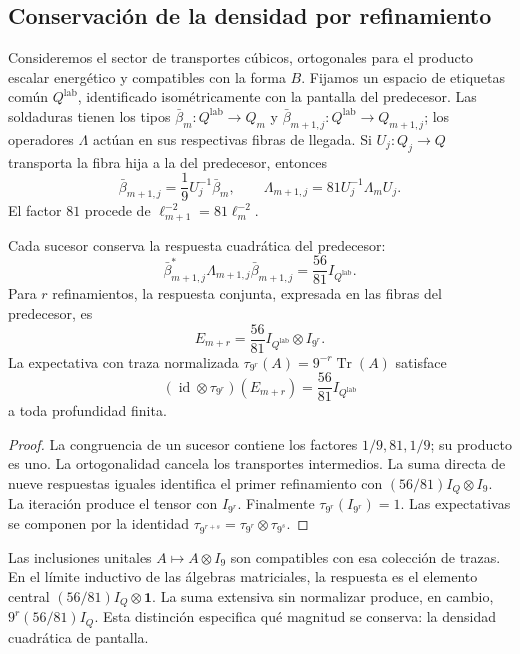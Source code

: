 \subsection{Conservación de la densidad por refinamiento}
\label{vii:sec:densidad-refinamiento}

Consideremos el sector de transportes cúbicos, ortogonales para el producto
escalar energético y compatibles con la forma \(B\). Fijamos un
espacio de etiquetas común \(Q^{\mathrm{lab}}\), identificado
isométricamente con la pantalla del predecesor. Las soldaduras tienen
los tipos
\(\bar\beta_m:Q^{\mathrm{lab}}\longrightarrow Q_m\) y
\(\bar\beta_{m+1,j}:Q^{\mathrm{lab}}\longrightarrow Q_{m+1,j}\);
los operadores \(\Lambda\) actúan en sus respectivas fibras de llegada.
Si
\(U_j:Q_j\longrightarrow Q\) transporta la fibra hija a la del predecesor,
entonces
\[
 \bar\beta_{m+1,j}=\frac19U_j^{-1}\bar\beta_m,\qquad
 \Lambda_{m+1,j}=81U_j^{-1}\Lambda_mU_j.
\]
El factor \(81\) procede de \(\ell_{m+1}^{-2}=81\ell_m^{-2}\).

\begin{theorem}
\label{vii:thm:densidad}
Cada sucesor conserva la respuesta cuadrática del predecesor:
\[
 \bar\beta_{m+1,j}^*\Lambda_{m+1,j}\bar\beta_{m+1,j}
 =\frac{56}{81}I_{Q^{\mathrm{lab}}}.
\]
Para \(r\) refinamientos, la respuesta conjunta, expresada en las fibras
del predecesor, es
\[
 E_{m+r}=\frac{56}{81}I_{Q^{\mathrm{lab}}}\otimes I_{9^r}.
\]
La expectativa con traza normalizada
\(\tau_{9^r}(A)=9^{-r}\operatorname{Tr}(A)\) satisface
\[
 (\operatorname{id}\otimes\tau_{9^r})(E_{m+r})
 =\frac{56}{81}I_{Q^{\mathrm{lab}}}
\]
a toda profundidad finita.
\end{theorem}

\begin{proof}
La congruencia de un sucesor contiene los factores \(1/9,81,1/9\);
su producto es uno. La ortogonalidad cancela los transportes
intermedios. La suma directa de nueve respuestas iguales identifica
el primer refinamiento con \((56/81)I_Q\otimes I_9\).
La iteración produce el tensor con \(I_{9^r}\).
Finalmente \(\tau_{9^r}(I_{9^r})=1\). Las expectativas se componen
por la identidad
\(\tau_{9^{r+s}}=\tau_{9^r}\otimes\tau_{9^s}\).
\end{proof}

Las inclusiones unitales \(A\mapsto A\otimes I_9\) son compatibles con
esa colección de trazas. En el límite inductivo de las álgebras matriciales,
la respuesta es el elemento central
\((56/81)I_Q\otimes\mathbf1\). La suma extensiva sin normalizar produce,
en cambio, \(9^r(56/81)I_Q\). Esta distinción especifica qué magnitud
se conserva: la densidad cuadrática de pantalla.

